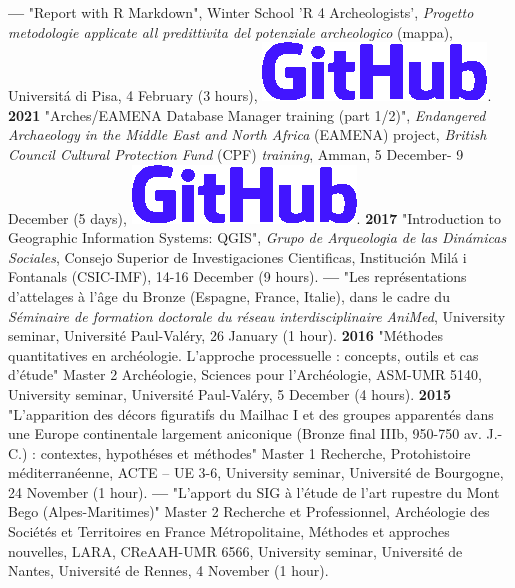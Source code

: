 \documentclass{article}
\begin{document}
\smallbreak
\textbf{--- }"Report with R Markdown", Winter School 'R 4 Archeologists', \textit{Progetto metodologie applicate all predittivita del potenziale archeologico} (mappa), Universit\'{a} di Pisa, 4 February (3 hours), \href{https://github.com/zoometh/thomashuet/tree/main/profiles/oxford/R4A#readme}{\includegraphics[scale=0.12]{github-rect.png}}.
\smallbreak
\textbf{2021 }"Arches/EAMENA Database Manager training (part 1/2)", \textit{Endangered Archaeology in the Middle East and North Africa} (EAMENA) project, \textit{British Council Cultural Protection Fund} (CPF) \textit{training}, Amman, 5 December- 9 December (5 days), \href{https://github.com/eamena-oxford/eamena-arches-dev/tree/main/training#readme}{\includegraphics[scale=0.12]{github-rect.png}}.
\smallbreak 
\textbf{2017 }"Introduction to Geographic Information Systems: QGIS", \textit{Grupo de Arqueologia de las Din\'{a}micas Sociales}, Consejo Superior de Investigaciones Cientificas, Instituci\'{o}n Mil\'{a} i Fontanals (CSIC-IMF), 14-16 December (9 hours).
\smallbreak
\textbf{--- }"Les repr\'{e}sentations d'attelages \`{a} l'\^{a}ge du Bronze (Espagne, France, Italie), dans le cadre du \textit{S\'{e}minaire de formation doctorale du r\'{e}seau interdisciplinaire AniMed}, University seminar, Universit\'{e} Paul-Val\'{e}ry, 26 January (1 hour).
\smallbreak
\textbf{2016 }"M\'{e}thodes quantitatives en arch\'{e}ologie. L'approche processuelle : concepts, outils et cas d'\'{e}tude" Master 2 Arch\'{e}ologie, Sciences pour l'Arch\'{e}ologie, ASM-UMR 5140, University seminar, Universit\'{e} Paul-Val\'{e}ry, 5 December (4 hours).
\smallbreak
\textbf{2015 }"L'apparition des d\'{e}cors figuratifs du Mailhac I et des groupes apparent\'{e}s dans une Europe continentale largement aniconique (Bronze final IIIb, 950-750 av. J.-C.) : contextes, hypoth\'{e}ses et m\'{e}thodes" Master 1 Recherche, Protohistoire m\'{e}diterran\'{e}enne, ACTE -- UE 3-6, University seminar, Universit\'{e} de Bourgogne, 24 November (1 hour).
\smallbreak
\textbf{--- }"L'apport du SIG \`{a} l'\'{e}tude de l'art rupestre du Mont Bego (Alpes-Maritimes)" Master 2 Recherche et Professionnel, Arch\'{e}ologie des Soci\'{e}t\'{e}s et Territoires en France M\'{e}tropolitaine, M\'{e}thodes et approches nouvelles, LARA, CReAAH-UMR 6566, University seminar, Universit\'{e} de Nantes, Universit\'{e} de Rennes, 4 November (1 hour).
\end{document}
